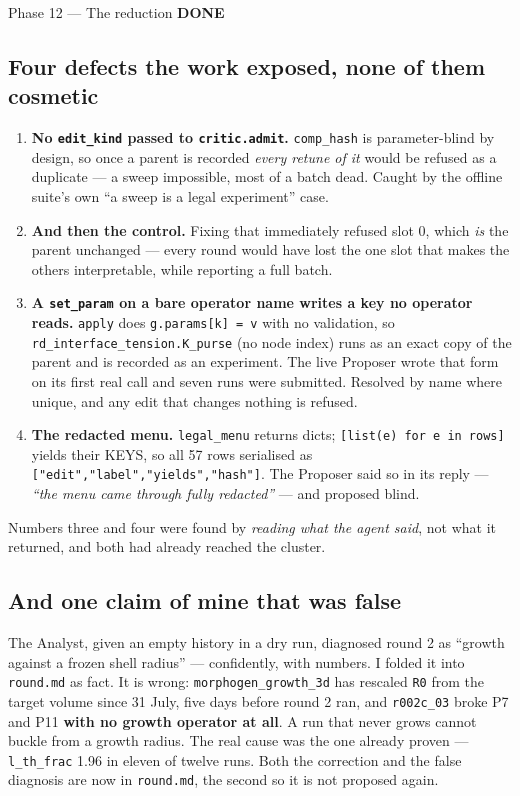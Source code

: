 \documentclass[11pt,a4paper]{article}
\newcommand{\code}[1]{\texttt{#1}}
\newcommand{\done}{\textcolor{good}{\textbf{DONE}}}
\begin{document}
\begin{phasebox}{Phase 12 --- The reduction \hfill \done}
\subsection*{Four defects the work exposed, none of them cosmetic}
\begin{enumerate}\itemsep3pt
\item \textbf{No \code{edit\_kind} passed to \code{critic.admit}.} \code{comp\_hash} is
parameter-blind by design, so once a parent is recorded \emph{every retune of it} would be refused as
a duplicate --- a sweep impossible, most of a batch dead. Caught by the offline suite's own
``a sweep is a legal experiment'' case.
\item \textbf{And then the control.} Fixing that immediately refused slot 0, which \emph{is} the
parent unchanged --- every round would have lost the one slot that makes the others interpretable,
while reporting a full batch.
\item \textbf{A \code{set\_param} on a bare operator name writes a key no operator reads.}
\code{apply} does \code{g.params[k] = v} with no validation, so \code{rd\_interface\_tension.K\_purse}
(no node index) runs as an exact copy of the parent and is recorded as an experiment. The live
Proposer wrote that form on its first real call and seven runs were submitted. Resolved by name where
unique, and any edit that changes nothing is refused.
\item \textbf{The redacted menu.} \code{legal\_menu} returns dicts; \code{[list(e) for e in rows]}
yields their KEYS, so all 57 rows serialised as \code{["edit","label","yields","hash"]}. The Proposer
said so in its reply --- \emph{``the menu came through fully redacted''} --- and proposed blind.
\end{enumerate}

\noindent Numbers three and four were found by \emph{reading what the agent said}, not what it
returned, and both had already reached the cluster.

\subsection*{And one claim of mine that was false}
The Analyst, given an empty history in a dry run, diagnosed round 2 as ``growth against a frozen shell
radius'' --- confidently, with numbers. I folded it into \code{round.md} as fact. It is wrong:
\code{morphogen\_growth\_3d} has rescaled \code{R0} from the target volume since 31 July, five days
before round 2 ran, and \code{r002c\_03} broke P7 and P11 \textbf{with no growth operator at all}. A
run that never grows cannot buckle from a growth radius. The real cause was the one already proven ---
\code{l\_th\_frac} 1.96 in eleven of twelve runs. Both the correction and the false diagnosis are now
in \code{round.md}, the second so it is not proposed again.


\end{phasebox}
\end{document}

